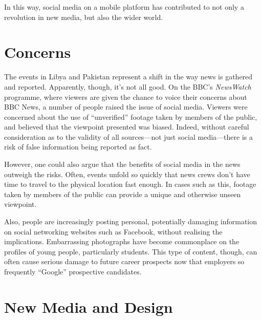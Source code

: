 \documentclass[a4paper,11pt]{article}
\begin{document}
    In this way, social media on a mobile platform has contributed to not only
    a revolution in new media, but also the wider world.

    \section{Concerns}

    The events in Libya and Pakistan represent a shift in the way news is
    gathered and reported.  Apparently, though, it's not all good. On the BBC's
    \emph{NewsWatch} programme, where viewers are given the chance to voice
    their concerns about BBC News, a number of people raised the issue of
    social media. Viewers were concerned about the use of ``unverified''
    footage taken by members of the public, and believed that the viewpoint
    presented was biased. Indeed, without careful consideration as to the
    validity of all sources---not just social media---there is a risk of false
    information being reported as fact.

    However, one could also argue that the benefits of social media in the news
    outweigh the risks. Often, events unfold so quickly that news crews don't
    have time to travel to the physical location fast enough. In cases such as
    this, footage taken by members of the public can provide a unique and
    otherwise unseen viewpoint.

    Also, people are increasingly posting personal, potentially damaging
    information on social networking websites such as Facebook, without
    realising the implications. Embarrassing photographs have become
    commonplace on the profiles of young people, particularly students. This
    type of content, though, can often cause serious damage to future career
    prospects now that employers so frequently ``Google'' prospective
    candidates.

    \section{New Media and Design}
\end{document}
